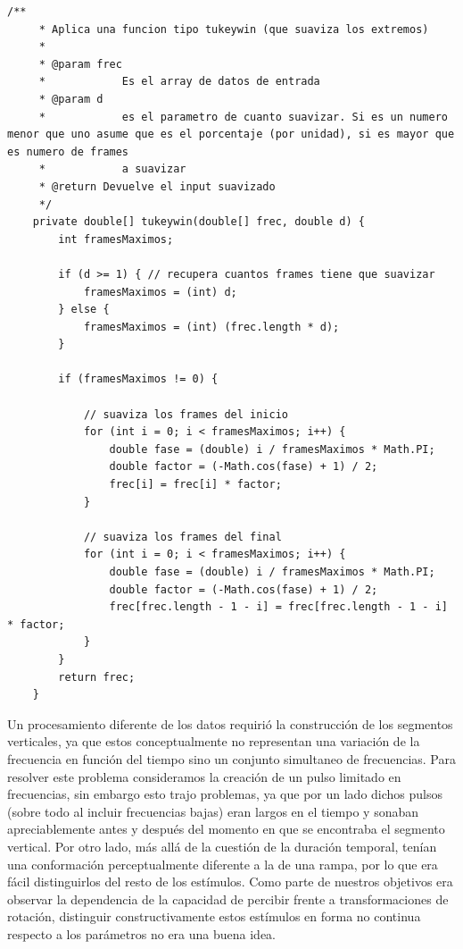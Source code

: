 \documentclass{article}
\begin{document}
	
	\begin{minipage}{\textwidth}
    \begin{lstlisting}[caption=Código que aplica el filtro tipo Tukey (ver figura \ref{fig:tukey}) para evitar la inclusión de armónicos por el efecto de los contornos., label=code:tukey]
     /**
	 * Aplica una funcion tipo tukeywin (que suaviza los extremos)
	 * 
	 * @param frec
	 *            Es el array de datos de entrada
	 * @param d
	 *            es el parametro de cuanto suavizar. Si es un numero menor que uno asume que es el porcentaje (por unidad), si es mayor que es numero de frames
	 *            a suavizar
	 * @return Devuelve el input suavizado
	 */
	private double[] tukeywin(double[] frec, double d) {
		int framesMaximos;

		if (d >= 1) { // recupera cuantos frames tiene que suavizar
			framesMaximos = (int) d;
		} else {
			framesMaximos = (int) (frec.length * d);
		}

		if (framesMaximos != 0) {

			// suaviza los frames del inicio
			for (int i = 0; i < framesMaximos; i++) {
				double fase = (double) i / framesMaximos * Math.PI;
				double factor = (-Math.cos(fase) + 1) / 2;
				frec[i] = frec[i] * factor;
			}

			// suaviza los frames del final
			for (int i = 0; i < framesMaximos; i++) {
				double fase = (double) i / framesMaximos * Math.PI;
				double factor = (-Math.cos(fase) + 1) / 2;
				frec[frec.length - 1 - i] = frec[frec.length - 1 - i] * factor;
			}
		}
		return frec;
	}
	\end{lstlisting}
	\end{minipage}
    
    Un procesamiento diferente de los datos requirió la construcción de los segmentos verticales, ya que estos conceptualmente no representan una variación de la frecuencia en función del tiempo sino un conjunto simultaneo de frecuencias. Para resolver este problema consideramos la creación de un pulso limitado en frecuencias, sin embargo esto trajo problemas, ya que por un lado dichos pulsos (sobre todo al incluir frecuencias bajas) eran largos en el tiempo y sonaban apreciablemente antes y después del momento en que se encontraba el segmento vertical. Por otro lado, más allá de la cuestión de la duración temporal, tenían una conformación perceptualmente diferente a la de una rampa, por lo que era fácil distinguirlos del resto de los estímulos. Como parte de nuestros objetivos era observar la dependencia de la capacidad de percibir frente a transformaciones de rotación, distinguir constructivamente estos estímulos en forma no continua respecto a los parámetros no era una buena idea. 
    
\end{document}
